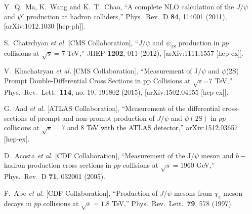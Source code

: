 \documentclass[aps,prc,preprint,superscriptaddress,showpacs,showkeys,amsmath]{revtex4-1}
\begin{document}
\begin{thebibliography}{100}
  Y.~Q.~Ma, K.~Wang and K.~T.~Chao,
  ``A complete NLO calculation of the $J/\psi$ and $\psi'$ production at hadron colliders,''
  Phys.\ Rev.\ D {\bf 84}, 114001 (2011),
  [arXiv:1012.1030 [hep-ph]].

  S.~Chatrchyan {\it et al.} [CMS Collaboration],
  ``$J/\psi$ and $\psi_{2S}$ production in $pp$ collisions at $\sqrt{s}=7$ TeV,''
  JHEP {\bf 1202}, 011 (2012),
  [arXiv:1111.1557 [hep-ex]].
  

  V.~Khachatryan {\it et al.} [CMS Collaboration],
  ``Measurement of J/$\psi$ and $\psi$(2S) Prompt Double-Differential Cross Sections in pp Collisions at $\sqrt{s}$=7  TeV,''
  Phys.\ Rev.\ Lett.\  {\bf 114}, no. 19, 191802 (2015),
  [arXiv:1502.04155 [hep-ex]].


  G.~Aad {\it et al.} [ATLAS Collaboration],
  ``Measurement of the differential cross-sections of prompt and non-prompt production of $J/\psi$ 
  and $\psi(2\mathrm{S})$ in $pp$ collisions at $\sqrt{s} = 7$ and $8$ TeV with the ATLAS detector,''
  arXiv:1512.03657 [hep-ex].


  D.~Acosta {\it et al.}  [CDF Collaboration],
  ``Measurement of the J/$\psi$ meson and $b-$hadron production cross sections in $p\bar{p}$ collisions at $\sqrt{s} = 1960$ GeV,''
  Phys.\ Rev.\ D {\bf 71}, 032001 (2005).


  F.~Abe {\it et al.} [CDF Collaboration],
  ``Production of $J/\psi$ mesons from $\chi_c$ meson decays in $p\bar{p}$ collisions at $\sqrt{s} = 1.8$ TeV,''
  Phys.\ Rev.\ Lett.\  {\bf 79}, 578 (1997).











\end{thebibliography}
\end{document}
